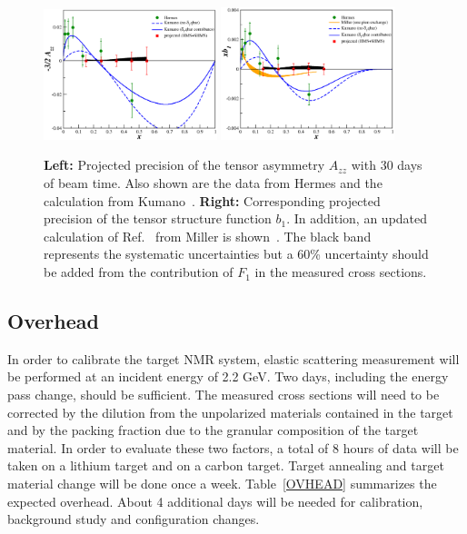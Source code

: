 \begin{figure}
\begin{center}
\includegraphics[width=0.45\textwidth]{figs/hallc/Azz_proj_lin.eps}
\hspace{0.5cm}
\includegraphics[width=0.45\textwidth]{figs/hallc/xb1_proj_newmiller_lin.eps}
\caption{\label{PROJ}
{\bf Left: }
Projected precision of the tensor asymmetry $A_{zz}$ with 30 days of beam time. Also 
shown are the data from Hermes\cite{Airapetian:2005cb} and the calculation from Kumano~\cite{Kumano:2010vz}.
{\bf Right:} Corresponding projected precision of the tensor structure function $b_1$. In addition,
an updated calculation of Ref.~\cite{Miller:1989nc} from Miller is shown~\cite{Miller_tmp}. The black band
represents the systematic uncertainties but a 60\% uncertainty should be added from the contribution
of $F_1$ in the measured cross sections.}
\end{center}
\end{figure}
%
\subsection{Overhead}
%
In order to calibrate the target NMR system, elastic scattering measurement will be performed at an 
incident energy of 2.2 GeV. Two days, including the energy pass change, should be sufficient. The 
measured cross sections will need to be corrected by the dilution from the unpolarized materials
contained in the target and by the packing fraction due to the granular composition of the target 
material. In order to evaluate these two factors, a total of 8 hours of data will be taken on a 
lithium target and on a carbon target. Target annealing and target material change will be done once 
a week. Table~\ref{OVHEAD} summarizes the expected overhead. About 4 additional days will be needed 
for calibration, background study and configuration changes.

